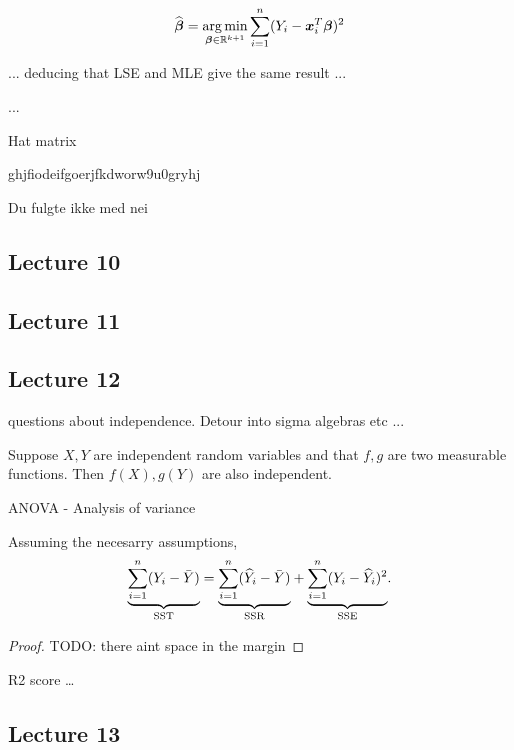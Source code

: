 $$
    \widehat{\boldsymbol{\beta}} = \operatorname*{arg\,min}_{\boldsymbol{\beta}\in\mathbb{R}^{k+1}} \sum_{i=1}^n (Y_i - \boldsymbol{x}_i^T\boldsymbol{\beta})^2
$$

... deducing that LSE and MLE give the same result ...

...

Hat matrix

ghjfiodeifgoerjfkdworw9u0gryhj

Du fulgte ikke med nei

\subsection*{Lecture 10}



\subsection*{Lecture 11}





\subsection*{Lecture 12}

questions about independence. Detour into sigma algebras etc ...

\begin{theorem}
    Suppose $X, Y$ are independent random variables and that $f, g$ are two measurable functions. Then $f(X), g(Y)$ are also independent. 
\end{theorem}

ANOVA - Analysis of variance

\begin{theorem} \label{thm:ANOVA}
    Assuming the necesarry assumptions, 
    $$
    \underset{\mathrm{SST}}{\underbrace{
        \sum_{i=1}^n (Y_i - \bar{Y})}} = 
    \underset{\mathrm{SSR}}{\underbrace{
        \sum_{i=1}^n (\widehat{Y}_i - \bar{Y})}} + 
    \underset{\mathrm{SSE}}{\underbrace{
        \sum_{i=1}^n (Y_i - \widehat{Y}_i)^2}}. 
    $$
\end{theorem}
\begin{proof}
    TODO: there aint space in the margin
\end{proof}


R2 score \dots


\subsection*{Lecture 13}


